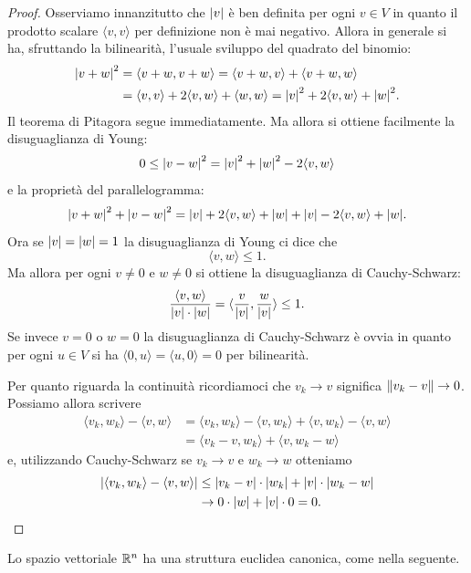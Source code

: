 \begin{proof}
Osserviamo innanzitutto che ${\left|v\right|}$ è ben definita per ogni $v\in V$
in quanto il prodotto scalare $\langle v,v\rangle$ per definizione non è mai negativo.
Allora in generale si ha, sfruttando la bilinearità,
l'usuale sviluppo del quadrato del binomio:
\begin{align*}
  {\left|v+w\right|}^2
  &= \langle v+w, v+w\rangle
  = \langle v+w, v\rangle + \langle v+w, w\rangle \\
  &= \langle v,v\rangle + 2\langle v,w \rangle + \langle w,w\rangle
  = {\left|v\right|}^2 + 2\langle v,w \rangle + {\left|w\right|}^2.
\end{align*}
Il teorema di Pitagora segue immediatamente.
Ma allora si ottiene facilmente la disuguaglianza di Young:
\[
  0 \le {\left|v-w\right|}^2 = {\left|v\right|}^2 + {\left|w\right|}^2 - 2 \langle v,w\rangle
\]
e la proprietà del parallelogramma:
\[
  {\left|v+w\right|}^2 + {\left|v-w\right|}^2
  = {\left|v\right|} + 2\langle v,w \rangle + {\left|w\right|}
    + {\left|v\right|} - 2\langle v,w\rangle + {\left|w\right|}.
\]
Ora se ${\left|v\right|}={\left|w\right|}=1$ la disuguaglianza di Young ci dice che
\[
  \langle v,w \rangle \le 1.
\]
Ma allora per ogni $v\neq 0$ e $w \neq 0$ si ottiene
la disuguaglianza di Cauchy-Schwarz:
\[
\frac{\langle v,w\rangle}{{\left|v\right|}\cdot {\left|w\right|}}
 = \langle \frac{v}{{\left|v\right|}} , \frac{w}{{\left|v\right|}}\rangle
 \le 1.
\]
Se invece $v=0$ o $w=0$ la disuguaglianza di Cauchy-Schwarz è ovvia in quanto
per ogni $u\in V$ si ha
$\langle 0, u\rangle = \langle u,0\rangle = 0$ per bilinearità.

Per quanto riguarda la continuità
ricordiamoci che $v_k \to v$ significa ${\left\Vert v_k-v\right\Vert}\to 0$.
Possiamo allora scrivere
\begin{align*}
  \langle v_k,w_k\rangle - \langle v,w\rangle
&= \langle v_k,w_k\rangle - \langle v, w_k\rangle +  \langle v,w_k\rangle - \langle v,w\rangle \\
&= \langle v_k - v, w_k\rangle + \langle v, w_k -w\rangle
\end{align*}
e, utilizzando Cauchy-Schwarz se $v_k\to v$ e $w_k\to w$ otteniamo
\begin{align*}
{\left|\langle v_k,w_k\rangle - \langle v,w\rangle\right|}
&\le {\left|v_k-v\right|}\cdot {\left|w_k\right|} + {\left|v\right|}\cdot {\left|w_k-w\right|}\\
&\to 0\cdot {\left|w\right|} + {\left|v\right|}\cdot 0 = 0.
\end{align*}
\end{proof}

Lo spazio vettoriale $\mathbb R^n$ ha una struttura euclidea canonica,
come nella seguente.

